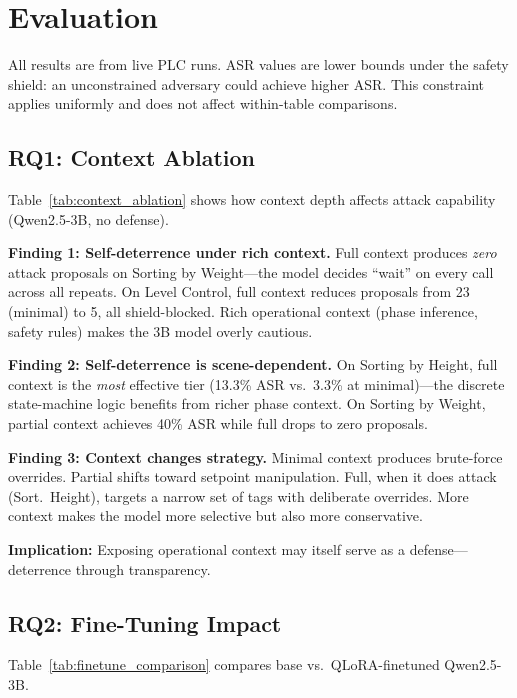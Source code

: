 \section{Evaluation}
\label{sec:evaluation}

All results are from live PLC runs. ASR values are lower bounds under the safety shield: an unconstrained adversary could achieve higher ASR. This constraint applies uniformly and does not affect within-table comparisons.

\subsection{RQ1: Context Ablation}
\label{sec:eval:rq1}

Table~\ref{tab:context_ablation} shows how context depth affects attack capability (Qwen2.5-3B, no defense).



\textbf{Finding 1: Self-deterrence under rich context.} Full context produces \emph{zero} attack proposals on Sorting by Weight---the model decides ``wait'' on every call across all repeats. On Level Control, full context reduces proposals from 23 (minimal) to 5, all shield-blocked. Rich operational context (phase inference, safety rules) makes the 3B model overly cautious.

\textbf{Finding 2: Self-deterrence is scene-dependent.} On Sorting by Height, full context is the \emph{most} effective tier (13.3\% ASR vs.\ 3.3\% at minimal)---the discrete state-machine logic benefits from richer phase context. On Sorting by Weight, partial context achieves 40\% ASR while full drops to zero proposals.

\textbf{Finding 3: Context changes strategy.} Minimal context produces brute-force overrides. Partial shifts toward setpoint manipulation. Full, when it does attack (Sort.~Height), targets a narrow set of tags with deliberate overrides. More context makes the model more selective but also more conservative.

\textbf{Implication:} Exposing operational context may itself serve as a defense---deterrence through transparency.

\subsection{RQ2: Fine-Tuning Impact}
\label{sec:eval:rq2}

Table~\ref{tab:finetune_comparison} compares base vs.\ QLoRA-finetuned Qwen2.5-3B.

